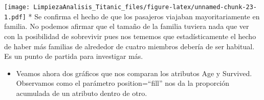 \documentclass[
]{article}
\newenvironment{Shaded}{\begin{snugshade}}{\end{snugshade}}
\newcommand{\AttributeTok}[1]{\textcolor[rgb]{0.80,0.80,0.80}{#1}}
\newcommand{\DecValTok}[1]{\textcolor[rgb]{0.86,0.86,0.80}{#1}}
\newcommand{\FunctionTok}[1]{\textcolor[rgb]{0.94,0.94,0.56}{#1}}
\newcommand{\NormalTok}[1]{\textcolor[rgb]{0.80,0.80,0.80}{#1}}
\newcommand{\OtherTok}[1]{\textcolor[rgb]{0.94,0.94,0.56}{#1}}
\newcommand{\SpecialCharTok}[1]{\textcolor[rgb]{0.86,0.64,0.64}{#1}}
\newcommand{\StringTok}[1]{\textcolor[rgb]{0.80,0.58,0.58}{#1}}
\providecommand{\tightlist}{%
  \setlength{\itemsep}{0pt}\setlength{\parskip}{0pt}}
\begin{document}
\begin{Shaded}
\end{Shaded}

\texttt{[image: LimpiezaAnalisis\_Titanic\_files/figure-latex/unnamed-chunk-23-1.pdf]}
* Se confirma el hecho de que los pasajeros viajaban mayoritariamente en
familia. No podemos afirmar que el tamaño de la familia tuviera nada que
ver con la posibilidad de sobrevivir pues nos tememos que
estadísticamente el hecho de haber más familias de alrededor de cuatro
miembros debería de ser habitual. Es un punto de partida para investigar
más.

\begin{itemize}
\tightlist
\item
  Veamos ahora dos gráficos que nos comparan los atributos Age y
  Survived. Observamos como el parámetro position=``fill'' nos da la
  proporción acumulada de un atributo dentro de otro.
\end{itemize}

\begin{Shaded}
\end{Shaded}
\end{document}
